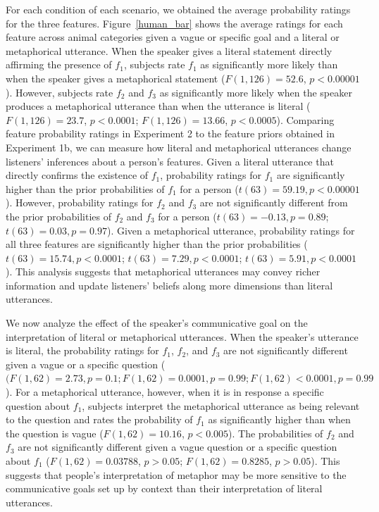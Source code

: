 \documentclass[10pt,letterpaper]{article}
\begin{document}
For each condition of each scenario, we obtained the average probability ratings for the three features. Figure~\ref{human_bar} shows the average ratings for each feature across animal categories given a vague or specific goal and a literal or metaphorical utterance. When the speaker gives a literal statement directly affirming the presence of $f_1$, subjects rate $f_1$ as significantly more likely than when the speaker gives a metaphorical statement ($F(1, 126) = 52.6$, $p < 0.00001$). However, subjects rate $f_2$ and $f_3$ as significantly more likely when the speaker produces a metaphorical utterance than when the utterance is literal ($F(1, 126) = 23.7$, $p < 0.0001$; $F(1, 126) =13.66$, $p < 0.0005$). Comparing feature probability ratings in Experiment 2 to the feature priors obtained in Experiment 1b, we can measure how literal and metaphorical utterances change listeners' inferences about a person's features. Given a literal utterance that directly confirms the existence of $f_1$, probability ratings for $f_1$ are significantly higher than the prior probabilities of $f_1$ for a person ($t(63) = 59.19, p < 0.00001$). However, probability ratings for $f_2$ and $f_3$ are not significantly different from the prior probabilities of $f_2$ and $f_3$ for a person ($t(63) = -0.13, p = 0.89$; $t(63) = 0.03, p = 0.97$). Given a metaphorical utterance, probability ratings for all three features are significantly higher than the prior probabilities ($t(63) = 15.74, p < 0.0001$; $t(63) = 7.29, p < 0.0001$; $t(63) = 5.91, p < 0.0001$). This analysis suggests that metaphorical utterances may convey richer information and update listeners' beliefs along more dimensions than literal utterances.

We now analyze the effect of the speaker's communicative goal on the interpretation of literal or metaphorical utterances. When the speaker's utterance is literal, the probability ratings for $f_1$, $f_2$, and $f_3$ are not significantly different given a vague or a specific question ($(F(1, 62)= 2.73, p =0.1; F(1, 62)=0.0001, p = 0.99; F(1, 62) < 0.0001, p = 0.99$). For a metaphorical utterance, however, when it is in response a specific question about $f_1$, subjects interpret the metaphorical utterance as being relevant to the question and rates the probability of $f_1$ as significantly higher than when the question is vague ($F(1, 62) = 10.16$, $p < 0.005$). The probabilities of $f_2$ and $f_3$ are not significantly different given a vague question or a specific question about $f_1$ ($F(1, 62) = 0.03788$, $p > 0.05$; $F(1, 62) = 0.8285$, $p > 0.05$). This suggests that people's interpretation of metaphor may be more sensitive to the communicative goals set up by context than their interpretation of literal utterances.
\end{document}
